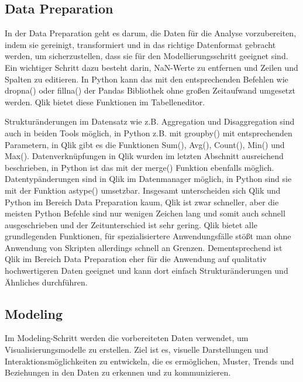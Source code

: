 \documentclass[12pt]{article}
\begin{document}
	\subsection{Data Preparation}
	In der Data Preparation geht es darum, die Daten für die Analyse vorzubereiten, indem sie gereinigt, transformiert und in das richtige Datenformat gebracht werden, um sicherzustellen, dass sie für den Modellierungsschritt geeignet sind.
	Ein wichtiger Schritt dazu besteht darin, NaN-Werte zu entfernen und Zeilen und Spalten zu editieren. In Python kann das mit den entsprechenden Befehlen wie dropna() oder fillna() der Pandas Bibliothek ohne großen Zeitaufwand umgesetzt werden.
	Qlik bietet diese Funktionen im Tabelleneditor.
	
	Strukturänderungen im Datensatz wie z.B. Aggregation und Disaggregation sind auch in beiden Tools möglich, in Python z.B. mit groupby() mit entsprechenden Parametern, in Qlik gibt es die Funktionen Sum(), Avg(), Count(), Min() und Max().
	Datenverknüpfungen in Qlik wurden im letzten Abschnitt  ausreichend beschrieben, in Python ist das mit der  merge() Funktion ebenfalls möglich.
	Datentypänderungen sind in Qlik im Datenmanager möglich, in Python sind sie mit der Funktion astype() umsetzbar.
	Insgesamt unterscheiden sich Qlik und Python im Bereich Data Preparation kaum, Qlik ist zwar schneller, aber die meisten Python Befehle sind nur wenigen Zeichen lang und somit auch schnell ausgeschrieben und der Zeitunterschied ist sehr gering. Qlik bietet alle grundlegenden Funktionen, für spezialisiertere Anwendungsfälle stößt man ohne Anwendung von Skripten allerdings schnell an Grenzen. Dementsprechend ist Qlik im Bereich Data Preparation eher für die Anwendung auf qualitativ hochwertigeren Daten geeignet und kann dort einfach Strukturänderungen und Ähnliches durchführen.
	
	
	\subsection{Modeling}
	Im Modeling-Schritt werden die vorbereiteten Daten verwendet, um Visualisierungsmodelle zu erstellen. Ziel ist es, visuelle Darstellungen und Interaktionsmöglichkeiten zu entwickeln, die es ermöglichen, Muster, Trends und Beziehungen in den Daten zu erkennen und zu kommunizieren.
	
\end{document}
